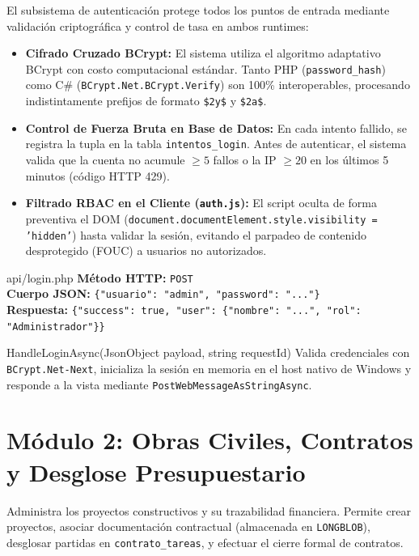 \documentclass[11pt,a4paper,openany]{report}
\begin{document}
El subsistema de autenticación protege todos los puntos de entrada mediante validación criptográfica y control de tasa en ambos runtimes:
\begin{itemize}[leftmargin=1.5em]
    \item \textbf{Cifrado Cruzado BCrypt:} El sistema utiliza el algoritmo adaptativo BCrypt con costo computacional estándar. Tanto PHP (\texttt{password\_hash}) como C\# (\texttt{BCrypt.Net.BCrypt.Verify}) son 100\% interoperables, procesando indistintamente prefijos de formato \texttt{\$2y\$} y \texttt{\$2a\$}.
    \item \textbf{Control de Fuerza Bruta en Base de Datos:} En cada intento fallido, se registra la tupla en la tabla \texttt{intentos\_login}. Antes de autenticar, el sistema valida que la cuenta no acumule $\ge 5$ fallos o la IP $\ge 20$ en los últimos 5 minutos (código HTTP 429).
    \item \textbf{Filtrado RBAC en el Cliente (\texttt{auth.js}):} El script oculta de forma preventiva el DOM (\texttt{document.documentElement.style.visibility = 'hidden'}) hasta validar la sesión, evitando el parpadeo de contenido desprotegido (FOUC) a usuarios no autorizados.
\end{itemize}

\begin{apibox}{api/login.php}
    \textbf{Método HTTP:} \texttt{POST}\\[0.1cm]
    \textbf{Cuerpo JSON:} \texttt{\{"usuario": "admin", "password": "..."\}}\\[0.1cm]
    \textbf{Respuesta:} \texttt{\{"success": true, "user": \{"nombre": "...", "rol": "Administrador"\}\}}
\end{apibox}

\begin{methodbox}{HandleLoginAsync(JsonObject payload, string requestId)}
    Valida credenciales con \texttt{BCrypt.Net-Next}, inicializa la sesión en memoria en el host nativo de Windows y responde a la vista mediante \texttt{PostWebMessageAsStringAsync}.
\end{methodbox}

\electricsep

\section{Módulo 2: Obras Civiles, Contratos y Desglose Presupuestario}

Administra los proyectos constructivos y su trazabilidad financiera. Permite crear proyectos, asociar documentación contractual (almacenada en \texttt{LONGBLOB}), desglosar partidas en \texttt{contrato\_tareas}, y efectuar el cierre formal de contratos.
\end{document}
